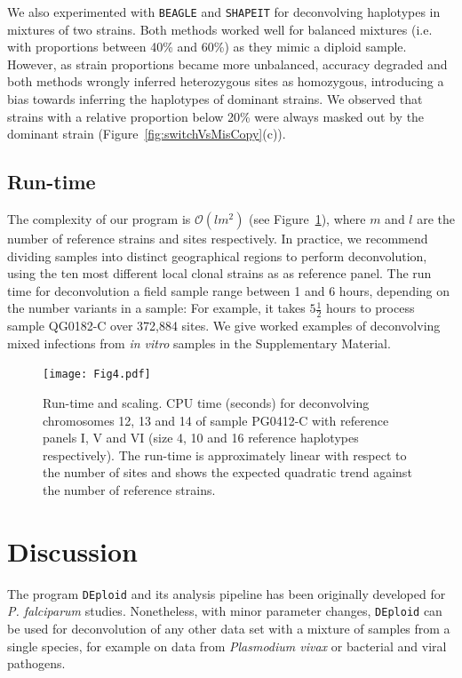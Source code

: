 \documentclass{bioinfo}
\begin{document}
We also experimented with \texttt{BEAGLE} and \texttt{SHAPEIT} for deconvolving haplotypes in mixtures of two strains. Both methods worked well for balanced mixtures (i.e. with proportions between 40\% and 60\%) as they mimic a diploid sample. However, as strain proportions became more unbalanced, accuracy degraded and both methods wrongly inferred heterozygous sites as homozygous, introducing a bias towards inferring the haplotypes of dominant strains. We observed that strains with a relative proportion below 20\% were always masked out by the dominant strain (Figure~\ref{fig:switchVsMisCopy}(c)).

\subsection{Run-time}

The complexity of our program is $\mathcal{O}(lm^2)$ (see Figure~\ref{fig:runtime}), where $m$ and $l$ are the number of reference strains and sites respectively. In practice, we recommend dividing samples into distinct geographical regions to perform deconvolution, using the ten most different local clonal strains as as reference panel. The run time for deconvolution a field sample range between 1 and 6 hours, depending on the number variants in a sample: For example, it takes $5\frac{1}{2}$ hours to process sample {\textmd QG0182-C} over 372,884 sites.  We give worked examples of deconvolving mixed infections from {\it in vitro} samples in the Supplementary Material.



\begin{figure}[htb]
\centering
\texttt{[image: Fig4.pdf]}
\caption{Run-time and scaling.  CPU time (seconds) for deconvolving chromosomes 12, 13 and 14 of sample {\textmd PG0412-C} with reference panels I, V and VI (size 4, 10 and 16 reference haplotypes respectively). The run-time is approximately linear with respect to the number of sites and shows the expected quadratic trend against the number of reference strains.}\label{fig:runtime}
\end{figure}


\section{Discussion}

The program \texttt{DEploid} and its analysis pipeline has been originally developed for {\it P. falciparum} studies. Nonetheless, with minor parameter changes, \texttt{DEploid} can be used for deconvolution of any other data set with a mixture of samples from a single species, for example on data from {\it Plasmodium vivax} \citep{Pearson2016} or bacterial and viral pathogens.
\end{document}
